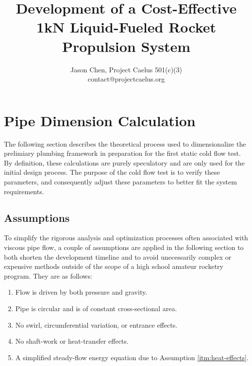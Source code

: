 \documentclass[11pt]{article} %
\title{Development of a Cost-Effective 1kN Liquid-Fueled Rocket Propulsion System}
\author{%
	Jason Chen, Project Caelus 501(c)(3)  \\
	\large contact@projectcaelus.org}
\numberwithin{equation}{section} %
\begin{document}
\maketitle

\section{Pipe Dimension Calculation}

The following section describes the theoretical process used to dimensionalize the prelimiary plumbing framework in preparation for the first static cold flow test. By definition, these calculations are purely speculatory and are only used for the initial design process. The purpose of the cold flow test is to verify these parameters, and consequently adjust these parameters to better fit the system requirements.

\subsection{Assumptions} \label{sec:assumptions}

To simplify the rigorous analysis and optimization processes often associated with viscous pipe flow, a couple of assumptions are applied in the following section to both shorten the development timeline and to avoid unecessarily complex or expensive methods outside of the scope of a high school amateur rocketry program. They are as follows:
\begin{enumerate}
\item Flow is driven by both pressure and gravity.
\item Pipe is circular and is of constant cross-sectional area. \label{itm:constant-area}
\item No swirl, circumferential variation, or entrance effects.
\item No shaft-work or heat-transfer effects. \label{itm:heat-effects}
\item A simplified steady-flow energy equation due to Assumption \ref{itm:heat-effects}.

\end{enumerate}
\end{document}
